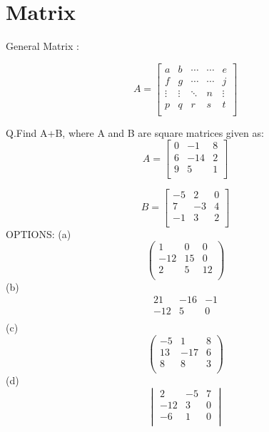 \documentclass{article}
\begin{document}
\section{Matrix}

General Matrix : 



\[A=
\begin{bmatrix}
	a & b & \cdots & \cdots & e\\
	f & g & \cdots & \cdots & j\\
	\vdots & \vdots & \ddots & n & \vdots\\
	p & q & r & s & t\\
\end{bmatrix}
\]

Q.Find A+B, where A and B are square matrices given as:
\[A=
\begin{bmatrix}
        0 & -1 & 8\\
        6 & -14 & 2\\
        9 & 5 & 1\\
\end{bmatrix}
\]


\[B=
\begin{bmatrix}
	-5 & 2 & 0\\
	7 & -3 & 4\\
	-1 & 3 &2\\
\end{bmatrix}
\]
OPTIONS:
(a) 
\[
	\begin{pmatrix}
		1 & 0 & 0\\
		-12 & 15 & 0\\
		2 & 5 & 12\\
	\end{pmatrix}
\]
(b)
\[
        \begin{matrix}
		21 & -16 & -1\\
		-12 & 5 & 0\\  
        \end{matrix}
\]
(c)
\[
        \begin{pmatrix}
		-5 & 1 & 8\\
		13 & -17 & 6\\
		8 & 8 & 3\\
        \end{pmatrix}
\]
(d)
\[
        \begin{vmatrix}
		2 & -5 & 7\\
		-12 & 3 & 0\\
		-6 & 1 & 0\\
        \end{vmatrix}
\]
\end{document}
